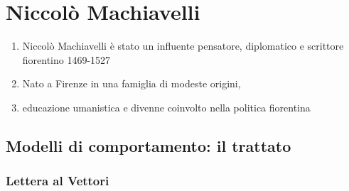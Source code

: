 \documentclass{article}
\begin{document}
\newpage
\section{Niccolò Machiavelli}

\begin{enumerate}
    \item Niccolò Machiavelli è stato un influente pensatore, diplomatico e scrittore fiorentino 1469-1527
    \item Nato a Firenze in una famiglia di modeste origini,
    \item educazione umanistica e divenne coinvolto nella politica fiorentina
\end{enumerate}

\subsection{Modelli di comportamento: il trattato}
\subsubsection{Lettera al Vettori}
\end{document}
